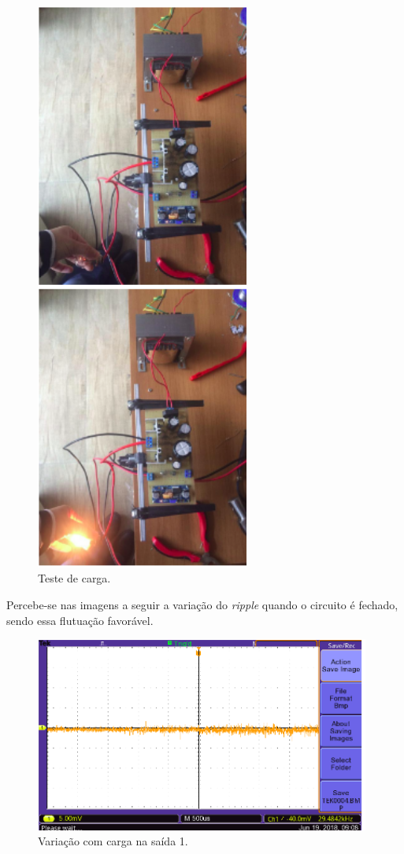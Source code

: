 \begin{figure}[H]
	\centering
	\includegraphics[width=7cm]{figuras/testeCarga.png}
	\caption{Teste de carga.}
	\label{testeCarga}
\end{figure}
\newpage
Percebe-se nas imagens a seguir a variação do \textit{ripple} quando o circuito é fechado, sendo essa flutuação favorável.
\begin{figure}[H]
	\centering
	\includegraphics[width=11cm]{figuras/variacao1.png}
	\caption{Variação com carga na saída 1.}
	\label{variacao1}
\end{figure}

